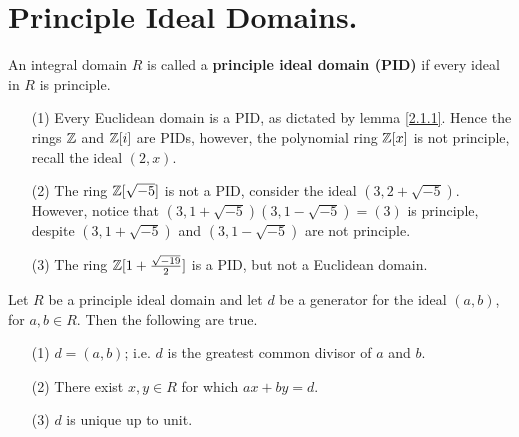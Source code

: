 \section{Principle Ideal Domains.}

\begin{definition}
    An integral domain $R$ is called a \textbf{principle ideal domain (PID)} if
    every ideal in $R$ is principle.
\end{definition}

\begin{example}\label{2.4}
    \begin{enumerate}
        \item[(1)] Every Euclidean domain is a PID, as dictated by lemma
            \ref{2.1.1}. Hence the rings $\mathbb{Z}$ and  $\mathbb{Z}[i]$ are PIDs, however,
            the polynomial ring $\mathbb{Z}[x]$ is not principle, recall the ideal
            $(2,x)$.

        \item[(2)] The ring $\mathbb{Z}[\sqrt{-5}]$ is not a PID, consider the ideal
            $(3,2+\sqrt{-5})$. However, notice that
            $(3,1+\sqrt{-5})(3,1-\sqrt{-5})=(3)$ is principle, despite
            $(3,1+\sqrt{-5})$ and $(3,1-\sqrt{-5})$ are not principle.

        \item[(3)] The ring $\mathbb{Z}[1+\frac{\sqrt{-19}}{2}]$ is a PID, but not a
            Euclidean domain.
    \end{enumerate}
\end{example}

\begin{lemma}\label{2.2.1}
    Let $R$ be a principle ideal domain and let $d$ be a generator for the ideal
    $(a,b)$, for $a,b \in R$. Then the following are true.
    \begin{enumerate}
        \item[(1)] $d=(a,b)$; i.e. $d$ is the greatest common divisor of $a$ and
            $b$.

        \item[(2)] There exist $x,y \in R$ for which  $ax+by=d$.

        \item[(3)] $d$ is unique up to unit.
    \end{enumerate}
\end{lemma}

